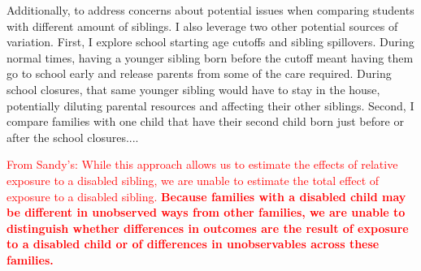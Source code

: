 Additionally, to address concerns about potential issues when comparing students with different amount of siblings. I also leverage two other potential sources of variation. First, I explore school starting age cutoffs and sibling spillovers. During normal times, having a younger sibling born before the cutoff meant having them go to school early and release parents from some of the care required. During school closures, that same younger sibling would have to stay in the house, potentially diluting parental resources and affecting their other siblings. Second, I compare families with one child that have their second child born just before or after the school closures....



\textcolor{red}{From Sandy's: While this approach allows us to estimate the effects of relative exposure to a disabled sibling, we are unable to estimate the total effect of exposure to a disabled sibling. \textbf{Because families with a disabled child may be different in unobserved ways from other families, we are unable to distinguish whether differences in outcomes are the result of exposure to a disabled child or of differences in unobservables across these families.}}

